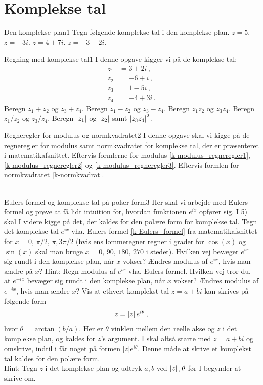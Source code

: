 \section*{Komplekse tal}
\begin{opgave}{Den komplekse plan}{1}
Tegn følgende komplekse tal i den komplekse plan.
\opg $z = 5$.
\opg $z = -3i$.
\opg $z = 4 + 7i$.
\opg $z = -3 - 2i$.
\end{opgave}
\begin{opgave}{Regning med komplekse tal}{1}
I denne opgave kigger vi på de komplekse tal:
\begin{align*}
z_1 &= 3 + 2i \, , \\
z_2 &= -6+i \, , \\ 
z_3 &= 1 - 5i \, , \\
z_4 &= -4 + 3i \, .
\end{align*}
\opg Beregn $z_1+z_2$ og $z_3+z_4$.
\opg Beregn $z_1-z_2$ og $z_3-z_4$.
\opg Beregn $z_1z_2$ og $z_3z_4$.
\opg Beregn $z_1/z_2$ og $z_3/z_4$.
\opg Beregn $\left| z_1 \right|$ og $\left| z_2 \right|$ samt $\left| z_3 z_4 \right|^2$. 
\end{opgave}
\begin{opgave}{Regneregler for modulus og normkvadratet}{2}
I denne opgave skal vi kigge på de regneregler for modulus samt normkvadratet for komplekse tal, der er  præsenteret i matematikafsnittet.
\opg Eftervis formlerne for modulus \eqref{k-modulus_regneregler1}, \eqref{k-modulus_regneregler2} og \eqref{k-modulus_regneregler3}.
\opg Eftervis formlen for normkvadratet \eqref{k-normkvadrat}.\\ \\  
\end{opgave}
\begin{opgave}{Eulers formel og komplekse tal på polær form}{3}
Her skal vi arbejde med Eulers formel og prøve at få lidt intuition for, hvordan funktionen $e^{ix}$ opfører sig. I 5) skal I videre kigge på det, der kaldes for den polære form for komplekse tal.
\opg Tegn det komplekse tal $e^{ix}$ vha. Eulers formel \eqref{k-Eulers_formel} fra matematikafsnittet for $x=0, \, \pi/2, \, \pi,3\pi/2$ (hvis ens lommeregner regner i grader for $\cos(x)$ og $\sin(x)$ skal man bruge $x=0, \, 90, \, 180, \, 270$ i stedet). Hvilken vej bevæger $e^{ix}$ sig rundt i den komplekse plan, når $x$ vokser?
\opg Ændres modulus af $e^{ix}$, hvis man ændre på $x$? Hint: Regn modulus af $e^{ix}$ vha. Eulers formel.
\opg Hvilken vej tror du, at $e^{-ix}$ bevæger sig rundt i den komplekse plan, når $x$ vokser?
\opg Ændres modulus af $e^{-ix}$, hvis man ændre $x$?
\opg Vis at ethvert komplekst tal $z = a+bi$ kan skrives på følgende form
\begin{align}
z = \left| z \right|e^{i\theta} \, ,
\end{align} 
hvor $\theta = \arctan(b/a)$. Her er $\theta$ vinklen mellem den reelle akse og $z$ i det komplekse plan, og kaldes for $z$'s argument. I skal altså starte med $z=a+bi$ og omskrive, indtil i får noget på formen $|z|e^{i\theta}$. Denne måde at skrive et komplekst tal kaldes for den polære form.\\
Hint: Tegn $z$ i det komplekse plan og udtryk $a,b$ ved $\left| z \right|,\theta$ før I begynder at skrive om.
\end{opgave}
